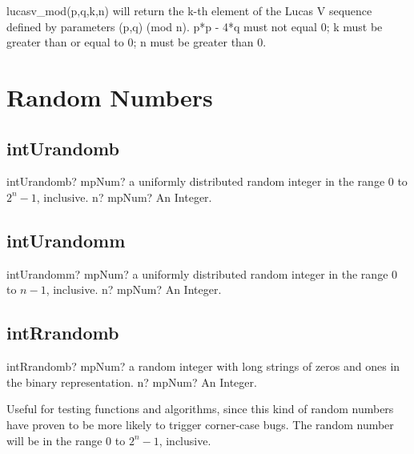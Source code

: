 \vspace{0.3cm}

lucasv\_mod(p,q,k,n) will return the k-th element of the Lucas V sequence defined by
parameters (p,q) (mod n). p*p - 4*q must not equal 0; k must be greater than or equal to 0; n
must be greater than 0.





\section{Random Numbers}
\label{intRandomNumbers}



\subsection{intUrandomb}

\begin{mpFunctionsExtract}
	\mpFunctionOne
	{intUrandomb? mpNum? a uniformly distributed random integer in the range 0 to $2^n - 1$, inclusive.}
	{n? mpNum? An Integer.}
\end{mpFunctionsExtract}



\subsection{intUrandomm}

\begin{mpFunctionsExtract}
	\mpFunctionOne
	{intUrandomm? mpNum? a uniformly distributed random integer in the range 0 to $n - 1$, inclusive.}
	{n? mpNum? An Integer.}
\end{mpFunctionsExtract}




\subsection{intRrandomb}

\begin{mpFunctionsExtract}
	\mpFunctionOne
	{intRrandomb? mpNum? a random integer with long strings of zeros and ones in the binary representation.}
	{n? mpNum? An Integer.}
\end{mpFunctionsExtract}

\vspace{0.3cm}
Useful for testing functions and algorithms, since this kind of random numbers have proven
to be more likely to trigger corner-case bugs. The random number will be in the range 0 to
$2^n - 1$, inclusive.




